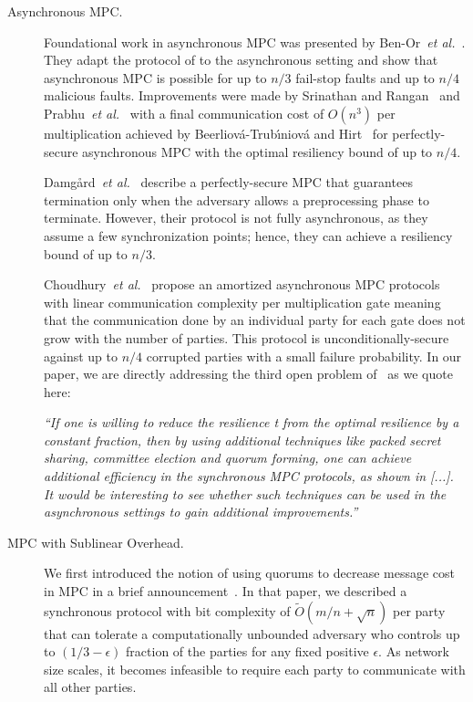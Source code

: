 \documentclass[11pt,letter]{article}
\newcommand{\etal}{\emph{et al.}}
\theoremstyle{mytheoremstyle}
\begin{document}
\begin{description}
	\item[Asynchronous MPC.]
	Foundational work in asynchronous MPC was presented by Ben-Or~\etal~\cite{benor_canetti_goldreich:asynchronous}. They adapt the protocol of \cite{bgw88} to the asynchronous setting and show that asynchronous MPC is possible for up to $n/3$ fail-stop faults and up to $n/4$ malicious faults. Improvements were made by Srinathan and Rangan~\cite{srinathan_pandu_rangan:efficient} and Prabhu~\etal~\cite{prabhu_srinathan_rangan:asynchronous} with a final
	communication cost of $O(n^3)$ per multiplication achieved by Beerliov\'{a}-Trub\'{\i}niov\'{a} and Hirt~\cite{Beerliova-Trubiniova:2007:SEP:1781454.1781486} for perfectly-secure asynchronous MPC with the optimal resiliency bound of up to $n/4$.
	
	Damg{\aa}rd~\etal~\cite{Damgard:2009:AMC:1531954.1531967} describe a perfectly-secure MPC that guarantees termination only when the adversary allows a preprocessing phase to terminate. However, their protocol is not fully asynchronous, as they assume a few synchronization points; hence, they can achieve a resiliency bound of up to $n/3$.
	
Choudhury~\etal~\cite{Choudhury:2013:AsyncMPC} propose an amortized asynchronous MPC protocols with linear communication complexity per multiplication gate meaning that the communication done by an individual party for each gate does not grow with the number of parties. This protocol is unconditionally-secure against up to $n/4$ corrupted parties with a small failure probability. In our paper, we are directly addressing the third open problem of~\cite{Choudhury:2013:AsyncMPC} as we quote here: 
	
	\emph{``If one is willing to reduce the resilience t from the optimal resilience by a constant fraction, then by using additional techniques like packed secret sharing, committee election and quorum forming, one can achieve additional efficiency in the synchronous MPC protocols, as shown in [...]. It would be interesting to see whether such techniques can be used in the asynchronous settings to gain additional improvements.''}
	






	\item[MPC with Sublinear Overhead.]
	We first introduced the notion of using quorums to decrease message cost in MPC in a brief announcement~\cite{Dani:2012:BAB:2332432.2332473}. In that paper, we described a synchronous protocol with bit complexity of $\tilde{O}(m/n + \sqrt{n})$ per party that can tolerate a computationally unbounded adversary who controls up to $(1/3 - \epsilon)$ fraction of the parties for any fixed positive $\epsilon$. As network size scales, it becomes infeasible to require each party to communicate with all other parties. 


\end{description}
\end{document}
